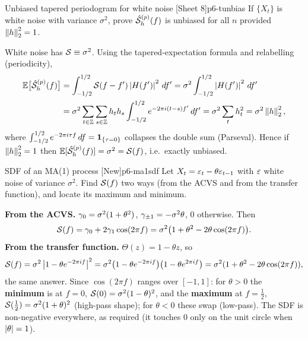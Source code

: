 \begin{exercise}{Unbiased tapered periodogram for white noise \quad\textnormal{[Sheet 8]}}{p6-tunbias}
If $\{X_t\}$ is white noise with variance $\sigma^2$, prove
$\hat{\mathcal{S}}^{(p)}_h(f)$ is unbiased for all $n$ provided $\left\lVert h \right\rVert_2^2=1$.
\end{exercise}
\begin{solution}
White noise has $\mathcal{S}\equiv\sigma^2$. Using the tapered-expectation formula and
relabelling (periodicity),
\[
\begin{aligned}
\mathbb{E}\big[\hat{\mathcal{S}}^{(p)}_h(f)\big]
&=\int_{-1/2}^{1/2}\mathcal{S}(f-f')\left\lvert H(f') \right\rvert^2\,df'
 =\sigma^2\int_{-1/2}^{1/2}\left\lvert H(f') \right\rvert^2\,df'\\
&=\sigma^2\sum_{t\in\mathbb{Z}}\sum_{s\in\mathbb{Z}} h_t h_s
   \int_{-1/2}^{1/2} e^{-2\pi i(t-s)f'}\,df'
 =\sigma^2\sum_{t} h_t^2=\sigma^2\left\lVert h \right\rVert_2^2,
\end{aligned}
\]
where $\int_{-1/2}^{1/2}e^{-2\pi i\tau f}\,df=\mathbf{1}_{\{\tau=0\}}$ collapses the
double sum (Parseval). Hence if $\left\lVert h \right\rVert_2^2=1$ then
$\mathbb{E}[\hat{\mathcal{S}}^{(p)}_h(f)]=\sigma^2=\mathcal{S}(f)$, i.e.\ exactly unbiased.
\end{solution}


\begin{exercise}{SDF of an MA(1) process \quad\textnormal{[New]}}{p6-ma1sdf}
Let $X_t=\varepsilon_t-\theta\varepsilon_{t-1}$ with $\varepsilon$ white noise of variance
$\sigma^2$. Find $\mathcal{S}(f)$ two ways (from the ACVS and from the transfer
function), and locate its maximum and minimum.
\end{exercise}
\begin{solution}
\textbf{From the ACVS.} $\gamma_0=\sigma^2(1+\theta^2)$,
$\gamma_{\pm1}=-\sigma^2\theta$, $0$ otherwise. Then
\[
\mathcal{S}(f)=\gamma_0+2\gamma_1\cos(2\pi f)
=\sigma^2\big(1+\theta^2-2\theta\cos(2\pi f)\big).
\]
\textbf{From the transfer function.} $\Theta(z)=1-\theta z$, so
\[
\mathcal{S}(f)=\sigma^2\left\lvert 1-\theta e^{-2\pi i f} \right\rvert^2
=\sigma^2\big(1-\theta e^{-2\pi i f}\big)\big(1-\theta e^{2\pi i f}\big)
=\sigma^2(1+\theta^2-2\theta\cos(2\pi f)),
\]
the same answer. Since $\cos(2\pi f)$ ranges over $[-1,1]$: for $\theta>0$ the
\textbf{minimum} is at $f=0$, $\mathcal{S}(0)=\sigma^2(1-\theta)^2$, and the
\textbf{maximum} at $f=\tfrac12$, $\mathcal{S}(\tfrac12)=\sigma^2(1+\theta)^2$
(high-pass shape); for $\theta<0$ these swap (low-pass). The SDF is
non-negative everywhere, as required (it touches $0$ only on the unit circle
when $\left\lvert \theta \right\rvert=1$).
\end{solution}

